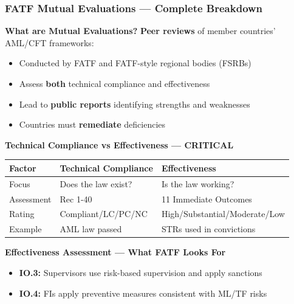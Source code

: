 \documentclass[12pt,aspectratio=169]{beamer}
\renewcommand{\scriptsize}{\fontsize{4.5}{5.5}\selectfont}
\newcommand{\keypoint}[1]{\textcolor{deepblue}{\textbf{#1}}}
\begin{document}
	\begin{frame}
		\frametitle{\fontsize{11}{13}\selectfont \textbf{FATF Mutual Evaluations — Complete Breakdown}}
		\begin{block}{\fontsize{7}{9}\selectfont \textbf{What are Mutual Evaluations?}}
			\scriptsize
			\textbf{Peer reviews} of member countries' AML/CFT frameworks:
			\begin{itemize}
				\item Conducted by FATF and FATF-style regional bodies (FSRBs)
				\item Assess \textbf{both} technical compliance and effectiveness
				\item Lead to \textbf{public reports} identifying strengths and weaknesses
				\item Countries must \textbf{remediate} deficiencies
			\end{itemize}
		\end{block}
		\vspace{0.02cm}
		\begin{block}{\fontsize{7}{9}\selectfont \textbf{Technical Compliance vs Effectiveness — CRITICAL}}
			\scriptsize
			\begin{tabular}{|p{}|p{}|p{0.36\textwidth}|}
				\hline
				\keypoint{Factor} & \keypoint{Technical Compliance} & \keypoint{Effectiveness} \\
				\hline
				Focus & Does the law exist? & Is the law working? \\
				\hline
				Assessment & Rec 1-40 & 11 Immediate Outcomes \\
				\hline
				Rating & Compliant/LC/PC/NC & High/Substantial/Moderate/Low \\
				\hline
				Example & AML law passed & STRs used in convictions \\
				\hline
			\end{tabular}
		\end{block}
		\vspace{0.02cm}
		\begin{block}{\fontsize{7}{9}\selectfont \textbf{Effectiveness Assessment — What FATF Looks For}}
			\scriptsize
			\begin{itemize}
				\item \textbf{IO.3:} Supervisors use risk-based supervision and apply sanctions
				\item \textbf{IO.4:} FIs apply preventive measures consistent with ML/TF risks

\end{itemize}
\end{block}
\end{frame}
\end{document}
